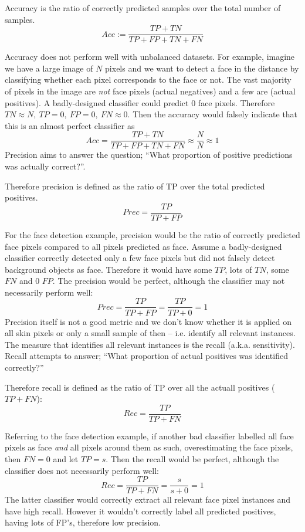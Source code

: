 \documentclass[a4paper]{article}
\begin{document}
\begin{definition}[accuracy]
Accuracy is the ratio of correctly predicted samples over the total number of samples.
\begin{equation}
    Acc := \frac{TP + TN}{TP + FP + TN + FN}
\end{equation}
\end{definition}
Accuracy does not perform well with unbalanced datasets. For example, imagine we have a large image of $N$ pixels and we want to detect a face in the distance by classifying whether each pixel corresponds to the face or not. The vast majority of pixels in the image are \textit{not} face pixels (actual negatives) and a few are (actual positives). A badly-designed classifier could predict 0 face pixels. Therefore $TN \approx N, \ TP = 0,\ FP = 0,\ FN \approx 0$. Then the accuracy would falsely indicate that this is an almost perfect classifier as
\[
Acc = \frac{TP + TN}{TP + FP + TN + FN} \approx \frac{N}{N} \approx 1
\]
Precision aims to answer the question; ``What proportion of positive predictions was actually correct?''. 
\begin{definition}[Precision]
Therefore precision is defined as the ratio of TP over the total predicted positives.
\begin{equation}
    Prec = \frac{TP}{TP + FP}
\end{equation}
\end{definition}
For the face detection example, precision would be the ratio of correctly predicted face pixels compared to all pixels predicted as face. Assume a badly-designed classifier correctly detected only a few face pixels but did not falsely detect background objects as face. Therefore it would have some $TP$, lots of $TN$, some $FN$ and 0 $FP$. The precision would be perfect, although the classifier may not necessarily perform well:
\[
Prec = \frac{TP}{TP + FP} = \frac{TP}{TP + 0} = 1
\]
Precision itself is not a good metric and we don't know whether it is applied on all skin pixels or only a small sample of then -- i.e. identify all relevant instances. The measure that identifies all relevant instances is the recall (a.k.a. sensitivity). Recall attempts to answer; ``What proportion of actual positives was identified correctly?''
\begin{definition}[recall]
Therefore recall is defined as the ratio of TP over all the actuall positives ($TP + FN$):
\begin{equation}
    Rec = \frac{TP}{TP + FN}
\end{equation}
\end{definition}
Referring to the face detection example, if another bad classifier labelled all face pixels as face \textit{and} all pixels around them as such, overestimating the face pixels, then $FN = 0$ and let $TP = s$. Then the recall would be perfect, although the classifier  does not necessarily perform well:
\[
Rec = \frac{TP}{TP + FN} = \frac{s}{s + 0} = 1
\]
The latter classifier would correctly extract all relevant face pixel instances and have high recall. However it wouldn't correctly label all predicted positives, having lots of FP's, therefore low precision. 
\end{document}

